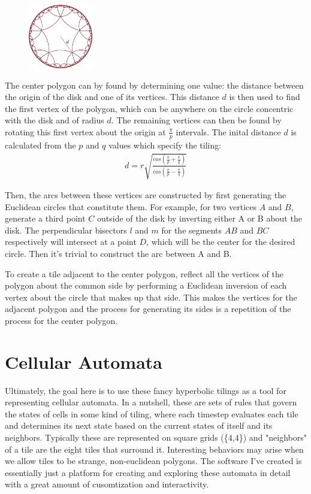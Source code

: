 \documentclass[letterpaper,12pt]{article}
\begin{document}
\begin{figure}
\includegraphics[width=0.25\textwidth]{../media/tilingDistance.png}
\end{figure}

The center polygon can by found by determining one value: the distance between the origin of the disk and one of its vertices. This distance $d$ is then used to find the first vertex of the polygon, which can be anywhere on the circle concentric with the disk and of radius $d$.  The remaining vertices can then be found by rotating this first vertex about the origin at $\frac{\pi}{p}$ intervals. The inital distance $d$ is calculated from the $p$ and $q$ values which specify the tiling:
\begin{gather*}
d = r\sqrt{\frac{cos(\frac{\pi}{p} + \frac{\pi}{q})}{cos(\frac{\pi}{p} - \frac{\pi}{q})}}
\end{gather*}

Then, the arcs between these vertices are constructed by first generating the Euclidean circles that constitute them. For example, for two vertices $A$ and $B$, generate a third point $C$ outside of the disk by inverting either A or B about the disk. The perpendicular bisectors $l$ and $m$ for the segments $AB$ and $BC$ respectively will intersect at a point $D$, which will be the center for the desired circle. Then it's trivial to construct the arc between A and B.

To create a tile adjacent to the center polygon, reflect all the vertices of the polygon about the common side by performing a Euclidean inversion of each vertex about the circle that makes up that side. This makes the vertices for the adjacent polygon and the process for generating its sides is a repetition of the process for the center polygon.

\section*{Cellular Automata}

Ultimately, the goal here is to use these fancy hyperbolic tilings as a tool for representing cellular automata. In a nutshell, these are sets of rules that govern the states of cells in some kind of tiling, where each timestep evaluates each tile and determines its next state based on the current states of itself and its neighbors. Typically these are represented on square grids (\{4,4\}) and "neighbors" of a tile are the eight tiles that surround it. Interesting behaviors may arise when we allow tiles to be strange, non-euclidean polygons. The software I've created is essentially just a platform for creating and exploring these automata in detail with a great amount of cusomtization and interactivity.
\end{document}
